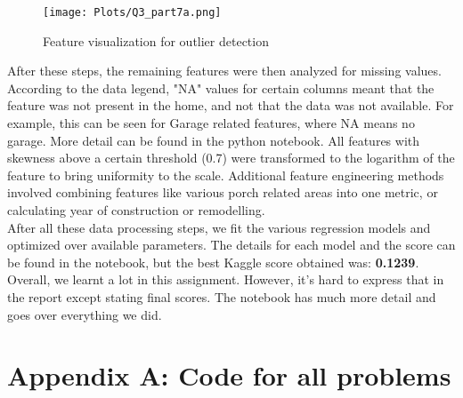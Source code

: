 \documentclass[12pt]{article}%
\begin{document}
\begin{figure}[h]
\texttt{[image: Plots/Q3\_part7a.png]}
\centering
\caption{Feature visualization for outlier detection}
\label{fig:Q3_part7a}
\centering
\end{figure}

After these steps, the remaining features were then analyzed for missing values. According to the data legend, "NA" values for certain columns meant that the feature was not present in the home, and not that the data was not available. For example, this can be seen for Garage related features, where NA means no garage. More detail can be found in the python notebook. All features with skewness above a certain threshold (0.7) were transformed to the logarithm of the feature to bring uniformity to the scale. Additional feature engineering methods involved combining features like various porch related areas into one metric, or calculating year of construction or remodelling. \\

After all these data processing steps, we fit the various regression models and optimized over available parameters. The details for each model and the score can be found in the notebook, but the best Kaggle score obtained was: \textbf{0.1239}. Overall, we learnt a lot in this assignment. However, it's hard to express that in the report except stating final scores. The notebook has much more detail and goes over everything we did.





\section*{Appendix A: Code for all problems}
\label{appendix:code}
\end{document}
